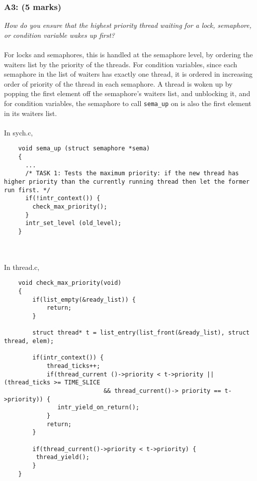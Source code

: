 \documentclass{article}
\begin{document}
\subsubsection*{A3: (5 marks) }
\textit{How do you ensure that the highest priority thread waiting for a lock, semaphore, or condition variable wakes up first?}
\\ \\
For locks and semaphores, this is handled at the semaphore level, by ordering the waiters list by the priority of the threads. For condition variables, since each semaphore in the list of waiters has exactly one thread, it is ordered in increasing order of priority of the thread in each semaphore.
A thread is woken up by popping the first element off the semaphore's waiters list, and unblocking it, and for condition variables, the semaphore to call \texttt{sema\_up} on is also the first element in its waiters list.
\\\\
In sych.c,
\begin{lstlisting}
    void sema_up (struct semaphore *sema)
    {
      ...
      /* TASK 1: Tests the maximum priority: if the new thread has higher priority than the currently running thread then let the former run first. */
      if(!intr_context()) {
        check_max_priority();
      }
      intr_set_level (old_level);
    }
\end{lstlisting}
\\\\
In thread.c,
\begin{lstlisting}
    void check_max_priority(void)
    {
        if(list_empty(&ready_list)) {
            return;
        }

        struct thread* t = list_entry(list_front(&ready_list), struct thread, elem);

        if(intr_context()) {
            thread_ticks++;
            if(thread_current ()->priority < t->priority || (thread_ticks >= TIME_SLICE
                            && thread_current()-> priority == t->priority)) {
               intr_yield_on_return();
            }
            return;
        }

        if(thread_current()->priority < t->priority) {
         thread_yield();
        }
    }

\end{lstlisting}
\end{document}
